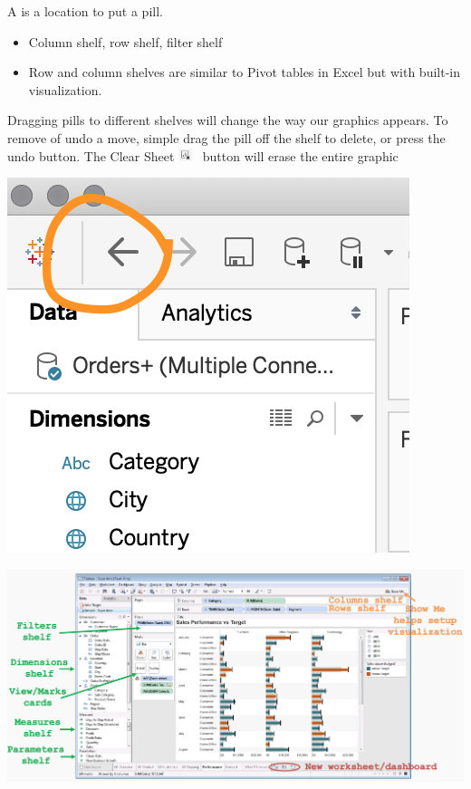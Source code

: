 \documentclass[xcolor=svgnames]{beamer} %
\begin{document}
\begin{frame}
A  is a location to put a pill.
\begin{itemize}
\item Column shelf, row shelf, filter shelf
\item Row and column shelves are similar to Pivot tables in Excel but with built-in visualization.\vfill
\end{itemize}
Dragging pills to different shelves will change the way our graphics appears.  To remove of undo a move, simple drag the pill off the shelf to delete, or press the undo button.  The Clear Sheet \includegraphics[height=1em]{img/clearsheet}~ button will erase the entire graphic 
\begin{center}
\includegraphics[width=.25\textwidth]{img/undo}
\end{center}
\end{frame}

\begin{frame}
\begin{center}
\includegraphics[width=1.05\textwidth]{img/workplaceitems}
\end{center}
\end{frame}
\end{document}
